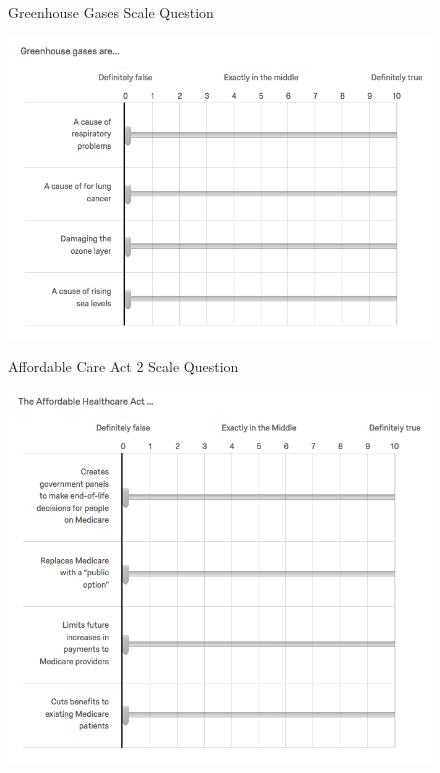 \begin{center}
	\begin{figure}[H]
		\centering
		\caption{Greenhouse Gases Scale Question}
		\includegraphics[width=\textwidth]{../figs/hk_gg1.png}
		\label{fig:gg1}
		\caption*{\footnotesize }
	\end{figure}
\end{center}


\begin{center}
	\begin{figure}[H]
		\centering
		\caption{Affordable Care Act 2 Scale Question}
		\includegraphics[width=\textwidth]{../figs/hk_aca2.png}
		\label{fig:aca2}
		\caption*{\footnotesize }
	\end{figure}
\end{center}


